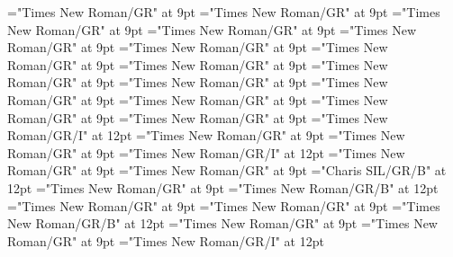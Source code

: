 \documentclass[gps1,twoside]{article}
\begin{document}
\font\spanreverseabbrvariantentrytypevariantentrytypesvariantformentrybackrefvariantformentrybackrefsentrylastchildafter="Times New Roman/GR" at 9pt
\font\spanspanheadwordvariantformentrybackrefvariantformentrybackrefsentrybefore="Times New Roman/GR" at 9pt
\font\spanspanowningentrysummarydefinitionvariantformentrybackrefvariantformentrybackrefsentrybefore="Times New Roman/GR" at 9pt
\font\spanowningentrysummarydefinitionvariantformentrybackrefvariantformentrybackrefsentrylastchildafter="Times New Roman/GR" at 9pt
\font\etymologyentrybefore="Times New Roman/GR" at 9pt
\font\etymologyentryafter="Times New Roman/GR" at 9pt
\font\spanspanformetymologyentrybefore="Times New Roman/GR" at 9pt
\font\spanformetymologyentrylastchildafter="Times New Roman/GR" at 9pt
\font\spanspanglossetymologyentrybefore="Times New Roman/GR" at 9pt
\font\spanglossetymologyentrylastchildafter="Times New Roman/GR" at 9pt
\font\spanspancommentetymologyentrybefore="Times New Roman/GR" at 9pt
\font\spancommentetymologyentrylastchildafter="Times New Roman/GR" at 9pt
\font\spanspanminimallexreferencesentrybefore="Times New Roman/GR" at 9pt
\font\minimallexreferencesentryafter="Times New Roman/GR" at 9pt
\font\spanenownertypeabbreviationminimallexreferenceminimallexreferencesentry="Times New Roman/GR/I" at 12pt
\font\spanspanownertypeabbreviationminimallexreferenceminimallexreferencesentrybefore="Times New Roman/GR" at 9pt
\font\spanownertypeabbreviationminimallexreferenceminimallexreferencesentrylastchildafter="Times New Roman/GR" at 9pt
\font\spanownertypeabbreviationminimallexreferenceminimallexreferencesentry="Times New Roman/GR/I" at 12pt
\font\configtargetconfigtargetconfigtargetsminimallexreferenceminimallexreferencesentrybefore="Times New Roman/GR" at 9pt
\font\configtargetsminimallexreferenceminimallexreferencesentryafter="Times New Roman/GR" at 9pt
\font\spanbzhheadwordconfigtargetconfigtargetsminimallexreferenceminimallexreferencesentry="Charis SIL/GR/B" at 12pt
\font\spanspanheadwordconfigtargetconfigtargetsminimallexreferenceminimallexreferencesentrybefore="Times New Roman/GR" at 9pt
\font\spanheadwordconfigtargetconfigtargetsminimallexreferenceminimallexreferencesentry="Times New Roman/GR/B" at 12pt
\font\spanspansensecontentspansensesentrybefore="Times New Roman/GR" at 9pt
\font\sensesentryafter="Times New Roman/GR" at 9pt
\font\sensenumbersensecontentsensesentry="Times New Roman/GR/B" at 12pt
\font\sensenumbersensecontentsensesentryafter="Times New Roman/GR" at 9pt
\font\morphosyntaxanalysissharedgrammaticalinfosensesentryafter="Times New Roman/GR" at 9pt
\font\morphosyntaxanalysissharedgrammaticalinfosensesentry="Times New Roman/GR/I" at 12pt
\end{document}
